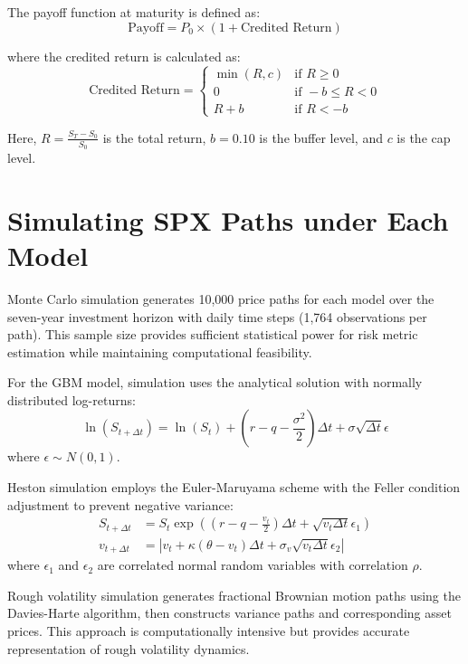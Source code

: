 \documentclass[12pt,a4paper]{report}
\begin{document}
The payoff function at maturity is defined as:
\begin{equation}
\text{Payoff} = P_0 \times (1 + \text{Credited Return})
\end{equation}

where the credited return is calculated as:
\begin{equation}
\text{Credited Return} = \begin{cases}
\min(R, c) & \text{if } R \geq 0 \\
0 & \text{if } -b \leq R < 0 \\
R + b & \text{if } R < -b
\end{cases}
\end{equation}

Here, $R = \frac{S_T - S_0}{S_0}$ is the total return, $b = 0.10$ is the buffer level, and $c$ is the cap level.

\section{Simulating SPX Paths under Each Model}

Monte Carlo simulation generates 10,000 price paths for each model over the seven-year investment horizon with daily time steps (1,764 observations per path). This sample size provides sufficient statistical power for risk metric estimation while maintaining computational feasibility.

For the GBM model, simulation uses the analytical solution with normally distributed log-returns:
\begin{equation}
\ln(S_{t+\Delta t}) = \ln(S_t) + (r - q - \frac{\sigma^2}{2})\Delta t + \sigma\sqrt{\Delta t}\epsilon
\end{equation}
where $\epsilon \sim N(0,1)$.

Heston simulation employs the Euler-Maruyama scheme with the Feller condition adjustment to prevent negative variance:
\begin{align}
S_{t+\Delta t} &= S_t \exp((r - q - \frac{v_t}{2})\Delta t + \sqrt{v_t \Delta t}\epsilon_1)\\
v_{t+\Delta t} &= |v_t + \kappa(\theta - v_t)\Delta t + \sigma_v\sqrt{v_t \Delta t}\epsilon_2|
\end{align}
where $\epsilon_1$ and $\epsilon_2$ are correlated normal random variables with correlation $\rho$.

Rough volatility simulation generates fractional Brownian motion paths using the Davies-Harte algorithm, then constructs variance paths and corresponding asset prices. This approach is computationally intensive but provides accurate representation of rough volatility dynamics.
\end{document}
